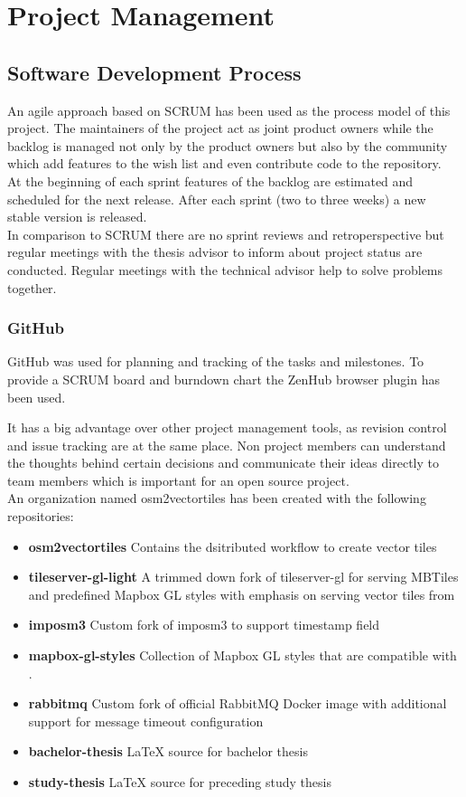 \chapter{Project Management}\label{project-management}

\section{Software Development Process}


An agile approach based on SCRUM has been used as the process model of this project.
The maintainers of the project act as joint product owners while the backlog is managed not only
by the product owners but also by the community which add features to the wish list and even contribute code to the repository.\\
At the beginning of each sprint features of the backlog are estimated and scheduled for the next release. After each sprint (two to three weeks) a new stable version is released.\\
In comparison to SCRUM there are no sprint reviews and retroperspective but regular meetings with the thesis advisor to inform about project status are conducted.
Regular meetings with the technical advisor help to solve problems together.

\subsection*{GitHub}\label{github}
GitHub was used for planning and tracking of the tasks and milestones.
To provide a SCRUM board and burndown chart the ZenHub browser plugin has been used.


It has a big advantage over other project management tools, as revision control and issue tracking are at the same place.
Non project members can understand the thoughts behind certain decisions and communicate their ideas directly to team members which is important for an open source project.\\

An organization named osm2vectortiles has been created with the following repositories:

\begin{itemize}
\item
  \textbf{osm2vectortiles} Contains the dsitributed workflow to create vector tiles
\item
  \textbf{tileserver-gl-light} A trimmed down fork of tileserver-gl for serving MBTiles and predefined Mapbox GL styles with emphasis on serving vector tiles from \osmvt{}
\item
  \textbf{imposm3} Custom fork of imposm3 to support timestamp field
\item
  \textbf{mapbox-gl-styles} Collection of Mapbox GL styles that are compatible with \osmvt{}.
\item
  \textbf{rabbitmq} Custom fork of official RabbitMQ Docker image with additional support for message timeout configuration
\item
  \textbf{bachelor-thesis} LaTeX source for bachelor thesis
\item
  \textbf{study-thesis} LaTeX source for preceding study thesis
\end{itemize}

